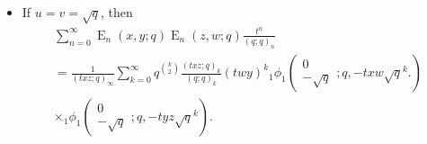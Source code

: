 \documentclass{cimart}
\DeclareMathOperator{\opE}{E}
\begin{document}
\begin{itemize}
    \item 
    If $u=v=\sqrt{q}$, then
\begin{multline}
    \sum_{n=0}^{\infty}\opE_{n}(x,y;q)\opE_{n}(z,w;q)\frac{t^n}{(q;q)_{n}}\\
    =\frac{1}{(txz;q)_{\infty}}\sum_{k=0}^{\infty}q^{\binom{k}{2}}\frac{(txz;q)_{k}}{(q;q)_{k}}(twy)^k{}_{1}\phi_{1}\left(
        \begin{array}{c}
            0\\
             -\sqrt{q}
        \end{array};
        q,-txw\sqrt{q}^k.
        \right)\\
        \times{}_{1}\phi_{1}\left(
        \begin{array}{c}
            0\\
             -\sqrt{q}
        \end{array};
        q,-tyz\sqrt{q}^k
        \right).
\end{multline}
\end{itemize}
\end{document}
